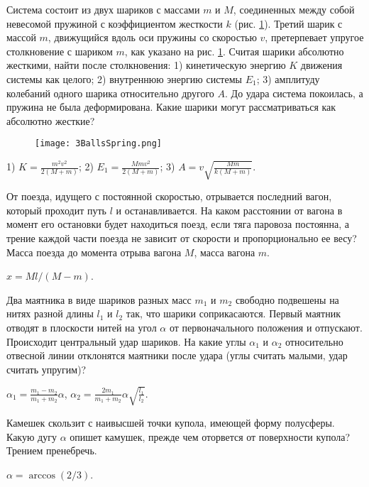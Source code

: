\begin{ex} %
Система состоит из двух шариков с массами $m$ и $M$, соединенных между собой невесомой пружиной с коэффициентом жесткости $k$ (рис. \ref{3BallsSpring}). Третий шарик с массой $m$, движущийся вдоль оси пружины со скоростью $v$, претерпевает упругое столкновение с шариком $m$, как указано на рис. \ref{3BallsSpring}. Считая шарики абсолютно жесткими, найти после столкновения: 1) кинетическую энергию $K$ движения системы как целого; 2) внутреннюю энергию системы $E_1$; 3) амплитуду колебаний одного шарика относительно другого $A$. До удара система покоилась, а пружина не была деформирована. Какие шарики могут рассматриваться как абсолютно жесткие?	

\begin{figure}[h]
\centering
\texttt{[image: 3BallsSpring.png]}
\caption{}
\label{3BallsSpring}
\end{figure}

\begin{ans}
1) $K=\frac{m^2v^2}{2(M+m)}$; 2) $E_1 = \frac{Mmv^2}{2(M+m)}$; 3) $A = v\sqrt{\frac{Mm}{k(M+m)}}$.
\end{ans}
\end{ex}

\begin{ex}  %
От поезда, идущего с постоянной скоростью, отрывается последний вагон, который проходит путь $l$ и останавливается. На каком расстоянии от вагона в момент его остановки будет находиться поезд, если тяга паровоза постоянна, а трение каждой части поезда не зависит от скорости и пропорционально ее весу? Масса поезда до момента отрыва вагона $M$, масса вагона $m$.
\begin{ans}
$x = Ml/(M-m)$.
\end{ans}
\end{ex}

\begin{ex} %
Два маятника в виде шариков разных масс $m_1$ и $m_2$ свободно подвешены на нитях разной длины $l_1$ и $l_2$ так, что шарики соприкасаются. Первый маятник отводят в плоскости нитей на угол $\alpha$ от первоначального положения и отпускают. Происходит центральный удар шариков. На какие углы $\alpha_1$ и $\alpha_2$ относительно отвесной линии отклонятся маятники после удара (углы считать малыми, удар считать упругим)?
\begin{ans}
$\alpha_1 =\frac{m_1-m_2}{m_1+m_2}\alpha$, $\alpha_2 =\frac{2m_1}{m_1+m_2}\alpha \sqrt{\frac{l_1}{l_2}}$.
\end{ans}
\end{ex}

\begin{ex} %
Камешек скользит с наивысшей точки купола, имеющей форму полусферы. Какую дугу $\alpha$ опишет камушек, прежде чем оторвется от поверхности купола? Трением пренебречь.
\begin{ans}
$\alpha = \arccos(2/3)$.
\end{ans}
\end{ex}

\clearpage